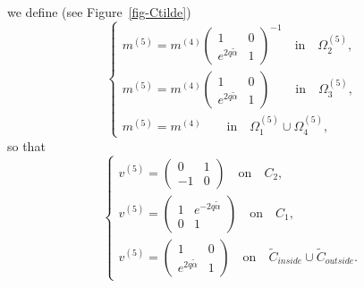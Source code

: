\documentclass{amsart}
\theoremstyle{definition}
\theoremstyle{remark}
\numberwithin{equation}{section}
\newcommand{\wt}{\widetilde}
\begin{document}
we define (see Figure~\ref{fig-Ctilde}) 
\begin{equation*}
  \begin{cases}
     m^{(5)}=m^{(4)} \begin{pmatrix} 1&0\\ e^{2q\wt{\alpha}}&1 \end{pmatrix}^{-1}
\quad\text{in}\quad \Omega^{(5)}_2,\\
     m^{(5)}=m^{(4)} \begin{pmatrix} 1&0\\ e^{2q\wt{\alpha}}&1 \end{pmatrix}
\qquad\text{in}\quad \Omega^{(5)}_3,\\
     m^{(5)}=m^{(4)} 
\qquad\text{in}\quad \Omega^{(5)}_1\cup\Omega^{(5)}_4,
  \end{cases}
\end{equation*}
so that 
\begin{equation*}
  \begin{cases}
    v^{(5)}=\begin{pmatrix} 0&1\\-1&0 \end{pmatrix} \quad\text{on}\quad C_2,\\
    v^{(5)}=\begin{pmatrix} 1&e^{-2q\wt{\alpha}}\\ 0&1 \end{pmatrix} \quad\text{on}\quad C_1,\\
    v^{(5)}=\begin{pmatrix} 1&0\\ e^{2q\wt{\alpha}}&1 \end{pmatrix}
\quad\text{on}\quad \wt{C}_{inside}\cup \wt{C}_{outside}.
  \end{cases}
\end{equation*}
\end{document}
